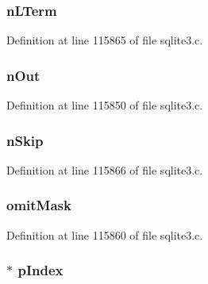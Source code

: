 \subsubsection[{n\+L\+Term}]{ n\+L\+Term}\label{struct_where_loop_a7acee2f8f328bc00604d8e56ee00c676}


Definition at line 115865 of file sqlite3.\+c.

\hypertarget{struct_where_loop_a0aa5ee9015b877549b7fceef6a0e81c5}{}
\subsubsection[{n\+Out}]{ n\+Out}\label{struct_where_loop_a0aa5ee9015b877549b7fceef6a0e81c5}


Definition at line 115850 of file sqlite3.\+c.

\hypertarget{struct_where_loop_a1e39909a6ad648d48569605ae0d1700a}{}
\subsubsection[{n\+Skip}]{ n\+Skip}\label{struct_where_loop_a1e39909a6ad648d48569605ae0d1700a}


Definition at line 115866 of file sqlite3.\+c.

\hypertarget{struct_where_loop_a9d044d3e695a6ffad60ed9479a7215be}{}
\subsubsection[{omit\+Mask}]{ omit\+Mask}\label{struct_where_loop_a9d044d3e695a6ffad60ed9479a7215be}


Definition at line 115860 of file sqlite3.\+c.

\hypertarget{struct_where_loop_a2bf7196ac1f39bd4b9dc95c3a9e9a68e}{}
\subsubsection[{p\+Index}]{$\ast$ p\+Index}\label{struct_where_loop_a2bf7196ac1f39bd4b9dc95c3a9e9a68e}


